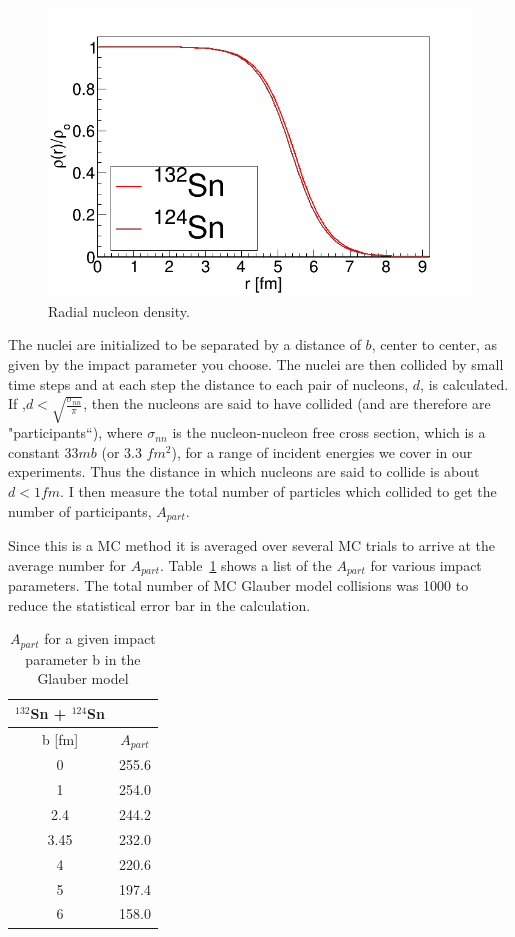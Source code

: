 \documentclass[12pt, letterpaper, twoside]{article}
\begin{document}
 
  \begin{figure}
\includegraphics[width=\textwidth]{density.png}
 \caption{Radial nucleon density.}
 \label{fig:radial}
\end{figure}

 The nuclei are initialized to be separated by a distance of $b$, center to center, as given by the impact parameter you choose. The nuclei are then collided by small time steps and at each step the distance to each pair of nucleons, $d$, is calculated. If ,$d < \sqrt{ \frac{ \sigma_{nn} }{\pi}}$, then the nucleons are said to have collided (and are therefore are "participants``), where $\sigma_{nn}$ is the nucleon-nucleon free cross section, which is a constant 33$mb$ (or 3.3 $fm^2$), for a range of incident energies we cover in our experiments. Thus the distance in which nucleons are said to collide is about $d < 1fm$. I then measure the total number of particles which collided to get the number of participants, $A_{part}$.
 
 Since this is a MC method it is averaged over several MC trials to arrive at the average number for $A_{part}$. Table~\ref{tb:apart} shows a list of the $A_{part}$ for various impact parameters. The total number of MC Glauber model collisions was 1000 to reduce the statistical error bar in the calculation. 

\begin{table}[!htb]
\begin{center}
 \begin{tabular}{||c c||}
 \hline
 ${}^{132}$Sn + ${}^{124}$Sn \\ [0.5ex] 
 \hline\hline
 b [fm] & $A_{part}$ \\ [0.5ex]
 \hline\hline
 0 &  255.6 \\
 \hline
 1 & 254.0 \\ 
 \hline
 2.4 & 244.2\\
 \hline
 3.45 & 232.0\\
 \hline
 4 & 220.6 \\
 \hline
 5 & 197.4 \\ 
 \hline
 6 & 158.0 \\ [1ex] 
 \hline
\end{tabular}
\end{center}
\caption{$A_{part}$ for a given impact parameter b in the Glauber model}
\label{tb:apart}
\end{table}
\end{document}
